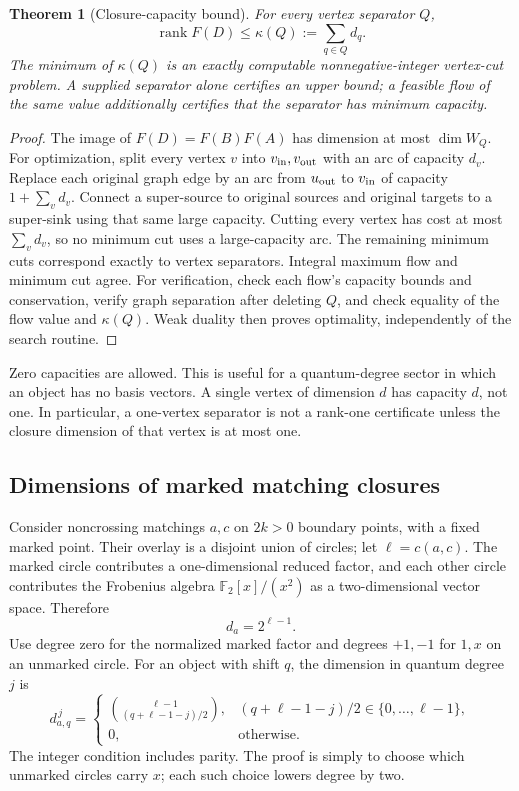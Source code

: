 \documentclass[11pt,letterpaper]{article}
\newtheorem{theorem}{Theorem}[section]
\theoremstyle{definition}\newtheorem{definition}[theorem]{Definition}
\theoremstyle{remark}\newtheorem{remark}[theorem]{Remark}
\newcommand{\F}{\mathbb F_2}
\newcommand{\rk}{\operatorname{rank}}
\begin{document}
\begin{theorem}[Closure-capacity bound]\label{thm:capacity}
For every vertex separator $Q$,
\begin{equation}
\rk F(D)\leq \kappa(Q):=\sum_{q\in Q}d_q.
\label{eq:cutrank}
\end{equation}
The minimum of $\kappa(Q)$ is an exactly computable nonnegative-integer
vertex-cut problem. A supplied separator alone certifies an upper bound;
a feasible flow of the same value additionally certifies that the separator
has minimum capacity.
\end{theorem}
\begin{proof}
The image of $F(D)=F(B)F(A)$ has dimension at most $\dim W_Q$.
For optimization, split every vertex $v$ into $v_{\rm in},v_{\rm out}$ with
an arc of capacity $d_v$. Replace each original graph edge by an arc from
$u_{\rm out}$ to $v_{\rm in}$ of capacity
$1+\sum_vd_v$. Connect a super-source to original sources and original targets
to a super-sink using that same large capacity. Cutting every vertex has
cost at most $\sum_vd_v$, so no minimum cut uses a large-capacity arc.
The remaining minimum cuts correspond exactly to vertex separators.
Integral maximum flow and minimum cut agree. For verification, check each
flow's capacity bounds and conservation, verify graph separation after
deleting $Q$, and check equality of the flow value and $\kappa(Q)$.
Weak duality then proves optimality, independently of the search routine.
\end{proof}

Zero capacities are allowed. This is useful for a quantum-degree sector in
which an object has no basis vectors. A single vertex of dimension $d$ has
capacity $d$, not one. In particular, a one-vertex separator is not a rank-one
certificate unless the closure dimension of that vertex is at most one.

\subsection{Dimensions of marked matching closures}
Consider noncrossing matchings $a,c$ on $2k>0$ boundary points, with a fixed
marked point. Their overlay is a disjoint union of circles; let
$\ell=c(a,c)$. The marked circle contributes a one-dimensional reduced
factor, and each other circle contributes the Frobenius algebra
$\F[x]/(x^2)$ as a two-dimensional vector space. Therefore
\begin{equation}
 d_a=2^{\ell-1}.
\label{eq:totalclosure}
\end{equation}
Use degree zero for the normalized marked factor and degrees $+1,-1$ for
$1,x$ on an unmarked circle. For an object with shift $q$, the dimension in
quantum degree $j$ is
\begin{equation}
 d_{a,q}^{\,j}=
 \begin{cases}
 \displaystyle\binom{\ell-1}{(q+\ell-1-j)/2},
 & (q+\ell-1-j)/2\in\{0,\ldots,\ell-1\},\\[4pt]
 0,&\text{otherwise}.
 \end{cases}
\label{eq:gradedclosure}
\end{equation}
The integer condition includes parity. The proof is simply to choose which
unmarked circles carry $x$; each such choice lowers degree by two.
\end{document}
